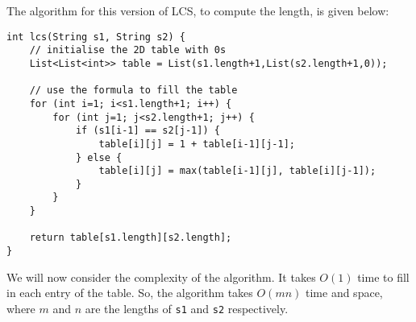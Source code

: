 \documentclass[a4paper, openany]{memoir}
\begin{document}
    The algorithm for this version of LCS, to compute the length, is given below:
\begin{lstlisting}[language=pseudocode]
int lcs(String s1, String s2) {
    // initialise the 2D table with 0s
    List<List<int>> table = List(s1.length+1,List(s2.length+1,0));

    // use the formula to fill the table
    for (int i=1; i<s1.length+1; i++) {
        for (int j=1; j<s2.length+1; j++) {
            if (s1[i-1] == s2[j-1]) {
                table[i][j] = 1 + table[i-1][j-1];
            } else {
                table[i][j] = max(table[i-1][j], table[i][j-1]);
            }
        }
    }

    return table[s1.length][s2.length];
}
\end{lstlisting}
    We will now consider the complexity of the algorithm. It takes $O(1)$ time to fill in each entry of the table. So, the algorithm takes $O(mn)$ time and space, where $m$ and $n$ are the lengths of \texttt{s1} and \texttt{s2} respectively.
\end{document}
